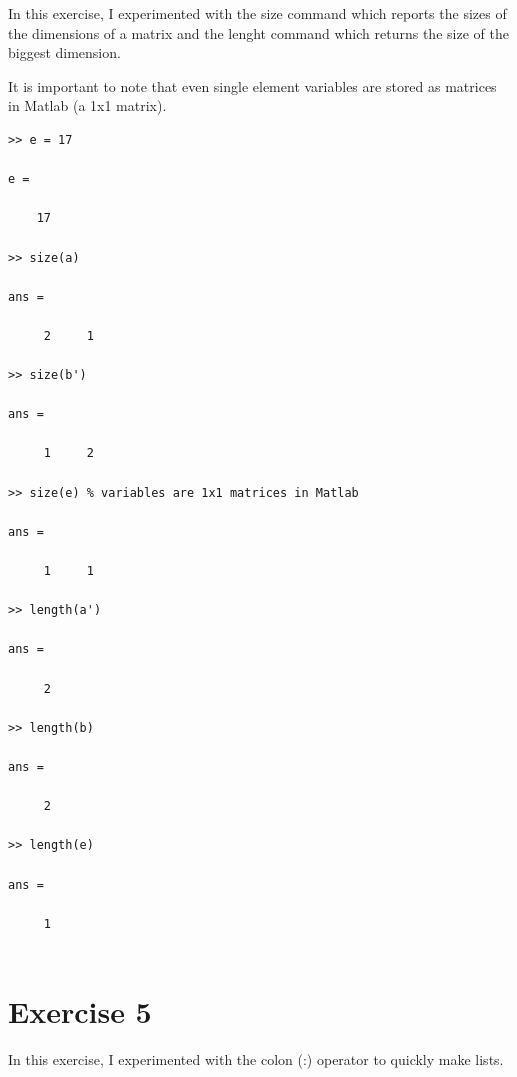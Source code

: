 \documentclass[11pt]{article}
\begin{document}
In this exercise, I experimented with the size command which reports the sizes of the dimensions of a matrix and the lenght command which returns the size of the biggest dimension.

It is important to note that even single element variables are stored as matrices in Matlab (a 1x1 matrix).

\begin{lstlisting}
>> e = 17

e =

    17

>> size(a)

ans =

     2     1

>> size(b')

ans =

     1     2

>> size(e) % variables are 1x1 matrices in Matlab

ans =

     1     1

>> length(a')

ans =

     2

>> length(b)

ans =

     2

>> length(e)

ans =

     1
 
\end{lstlisting}

\section{Exercise 5}

In this exercise, I experimented with the colon (:) operator to quickly make lists.
\end{document}
